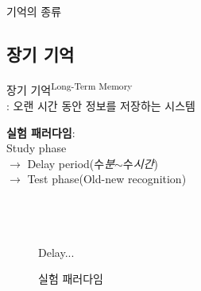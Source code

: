 \documentclass{beamer}
\begin{document}
\begin{frame}{기억의 종류}
\end{frame}

\subsection{장기 기억}
\begin{frame}{장기 기억\textsuperscript{Long-Term Memory}\\\normalsize{: 오랜 시간 동안 정보를 저장하는 시스템}}
  \noindent
  \begin{minipage}{0.4\textwidth}
    \vspace{2em}
    \textbf{실험 패러다임}:\\
    Study phase \\$\rightarrow$ Delay period(수\textit{분}$\sim$수\textit{시간}) \\$\rightarrow$ Test phase(Old-new recognition)\\~\\~\\~\\
  \end{minipage}%
  \begin{minipage}{0.6\textwidth}
      \centering
      \begin{figure}
      \qquad
      Delay...
      \vspace{-0.5em}
      \caption{실험 패러다임}
    \end{figure}
  \end{minipage}\\

\end{frame}
\end{document}
